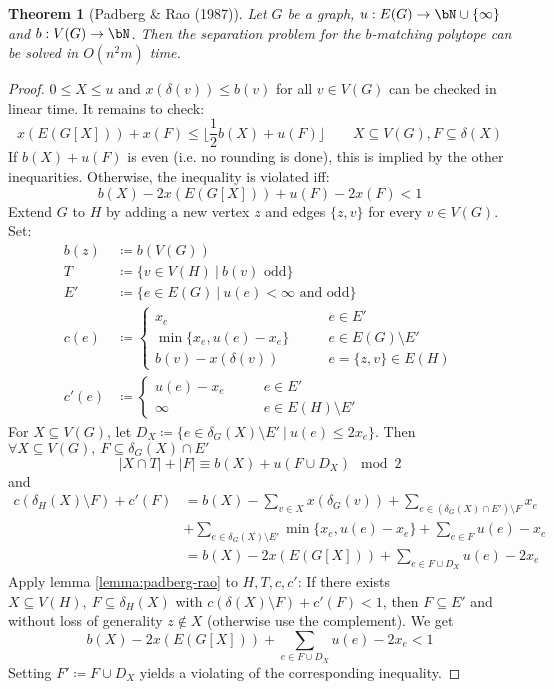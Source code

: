 \documentclass[11pt, a4paper]{article}
\newcommand{\floor}[1]{\lfloor #1 \rfloor}
\newcommand{\abs}[1]{\left\lvert#1\right\rvert}
\newcommand{\set}[1]{\{#1\}}
\newtheorem{theorem}{Theorem}[section]
\theoremstyle{remark}
\theoremstyle{definition}
\begin{document}
\begin{theorem}[Padberg \& Rao (1987)]\label{thm:padberg-rao}
	Let $G$ be a graph, $u: E(G)\to\bN\cup\set{\infty}$ and
	$b: V(G)\to\bN$. Then the separation problem for the $b$-matching
	polytope can be solved in $O(n^2m)$ time.
\end{theorem}
\begin{proof}
	$0\leq X\leq u$ and $x(\delta(v))\leq b(v)$ for all $v\in V(G)$ can be
	checked in linear time. It remains to check:
	\[x(E(G[X]))+x(F)\leq \floor{\frac{1}{2}b(X)+u(F)} \qquad X\subseteq V(G),F\subseteq \delta(X)\]
	If $b(X)+u(F)$ is even (i.e. no rounding is done), this is implied by
	the other inequarities. Otherwise, the inequality is violated iff:
	\[b(X)-2x(E(G[X]))+u(F)-2x(F)<1\]
	Extend $G$ to $H$ by adding a new vertex $z$ and edges $\set{z,v}$
	for every $v\in V(G)$. Set:
	\begin{align*}
		b(z)  & \coloneqq b(V(G))                                                                   \\
		T     & \coloneqq\set{v\in V(H) \ |\ b(v)\text{ odd}}                                       \\
		E'    & \coloneqq \set{e\in E(G)\ |\ u(e)<\infty\text{ and odd}}                            \\
		c(e)  & \coloneqq\begin{cases}
			                 x_e \qquad                    & e\in E'               \\
			                 \min\set{x_e,u(e)-x_e} \qquad & e\in E(G)\setminus E' \\
			                 b(v) - x(\delta(v)) \qquad    & e=\set{z,v}\in E(H)
		                 \end{cases} \\
		c'(e) & \coloneqq \begin{cases}
			                  u(e) - x_e \qquad & e\in E'               \\
			                  \infty \qquad     & e\in E(H)\setminus E'
		                  \end{cases}
	\end{align*}
	For $X\subseteq V(G)$, let $D_X\coloneqq \set{e\in \delta_G(X)\setminus E'
			\ |\ u(e)\leq 2x_e}$. Then $\forall X\subseteq V(G),\ F\subseteq \delta_G(X)
		\cap E'$
	\[\abs{X\cap T}+\abs{F}\equiv b(X)+u(F\cup D_X) \mod 2\]
	and
	\begin{align*}
		c(\delta_H(X)\setminus F)+c'(F) & =b(X)-\sum_{v\in X}x(\delta_G(v))+\sum_{e\in(\delta_G(X)\cap E')\setminus F}x_e    \\
		                                & + \sum_{e\in\delta_G(X)\setminus E'}\min\set{x_e,u(e)-x_e} + \sum_{e\in F}u(e)-x_e \\
		                                & =b(X)-2x(E(G[X]))+\sum_{e\in F\cup D_X}u(e)-2x_e
	\end{align*}
	Apply lemma \ref{lemma:padberg-rao} to $H,T,c,c'$: If there exists
	$X\subseteq V(H),\ F\subseteq \delta_H(X)$ with $c(\delta(X)\setminus F)
		+c'(F)<1$, then $F\subseteq E'$ and without loss of generality $z\notin X$
	(otherwise use the complement). We get
	\[b(X)-2x(E(G[X]))+\sum_{e\in F\cup D_X}u(e)-2x_e<1\]
	Setting $F'\coloneqq F\cup D_X$ yields a violating of the
	corresponding inequality.


\end{proof}
\end{document}
